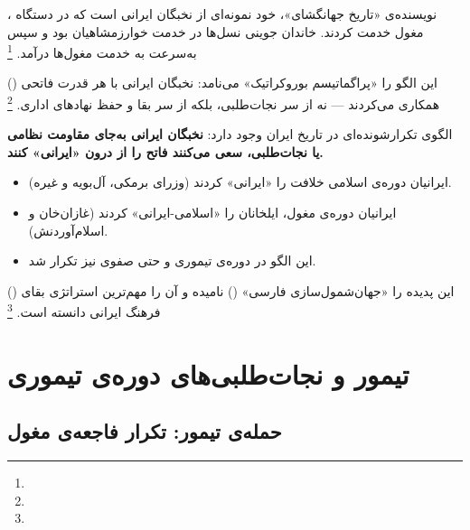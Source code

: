 ، نویسنده‌ی «تاریخ جهانگشای»، خود نمونه‌ای از نخبگان ایرانی است که در دستگاه مغول خدمت کردند. خاندان جوینی نسل‌ها در خدمت خوارزمشاهیان بود و سپس به‌سرعت به خدمت مغول‌ها درآمد.%
\footnote{}

 () این الگو را «پراگماتیسم بوروکراتیک» می‌نامد: نخبگان ایرانی با هر قدرت فاتحی همکاری می‌کردند — نه از سر نجات‌طلبی، بلکه از سر بقا و حفظ نهادهای اداری.%
\footnote{}

\begin{tcolorbox}[wavebox, title={الگوی «نفوذ از درون»: از ساسانیان تا مغول‌ها}]
الگوی تکرارشونده‌ای در تاریخ ایران وجود دارد: \textbf{نخبگان ایرانی به‌جای مقاومت نظامی یا نجات‌طلبی، سعی می‌کنند فاتح را از درون «ایرانی» کنند.}

\begin{itemize}[nosep, rightmargin=1em]
  \item ایرانیان دوره‌ی اسلامی خلافت را «ایرانی» کردند (وزرای برمکی، آل‌بویه و غیره).
  \item ایرانیان دوره‌ی مغول، ایلخانان را «اسلامی-ایرانی» کردند (غازان‌خان و اسلام‌آوردنش).
  \item این الگو در دوره‌ی تیموری و حتی صفوی نیز تکرار شد.
\end{itemize}

 () این پدیده را «جهان‌شمول‌سازی فارسی» () نامیده و آن را مهم‌ترین استراتژی بقای فرهنگ ایرانی دانسته است.%
\footnote{}
\end{tcolorbox}

\section{تیمور و نجات‌طلبی‌های دوره‌ی تیموری}
\label{sec:ch05-timur}

\subsection{حمله‌ی تیمور: تکرار فاجعه‌ی مغول}
\label{subsec:ch05-timur-invasion}

